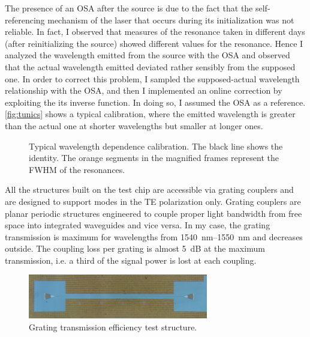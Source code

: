 The presence of an \ac{OSA} after the source is due to the fact that the self-referencing mechanism of the laser that occurs during its initialization was not reliable.
In fact, I observed that measures of the resonance taken in different days (after reinitializing the source) showed different values for the resonance.
Hence I analyzed the wavelength emitted from the source with the OSA and observed that
the actual wavelength emitted deviated rather sensibly from the supposed one.
In order to correct this problem, I sampled the supposed-actual wavelength relationship with the \ac{OSA}, and then I implemented an online correction by exploiting the its inverse function.
In doing so, I assumed the \ac{OSA} as a reference.
\autoref{fig:tunics} shows a typical calibration, where the emitted wavelength is greater than the actual one at shorter wavelengths but smaller at longer ones.

\begin{figure}[thbp]
	\centering
	
	\caption{Typical wavelength dependence calibration.
	The black line shows the identity.
	The orange segments in the magnified frames represent the \acs{FWHM} of the resonances.}
	\label{fig:tunics}
\end{figure}

All the structures built on the test chip are accessible via grating couplers and are designed to support modes in the \acs{TE} polarization only.
Grating couplers are planar periodic structures engineered to couple proper light bandwidth from free space into integrated waveguides and vice versa.
In my case, the grating transmission is maximum for wavelengths from \SIrange{1540}{1550}{\nm} and decreases outside.
The coupling loss per grating is almost \SI{5}{\dB} at the maximum transmission, i.e. a third of the signal power is lost at each coupling.

\newpage
\begin{figure}[htbp]
	\centering
	\includegraphics[width=0.7\textwidth]{photos/gg.png}
	\caption{Grating transmission efficiency test structure.}
	\label{fig:grating-grating}
\end{figure}


